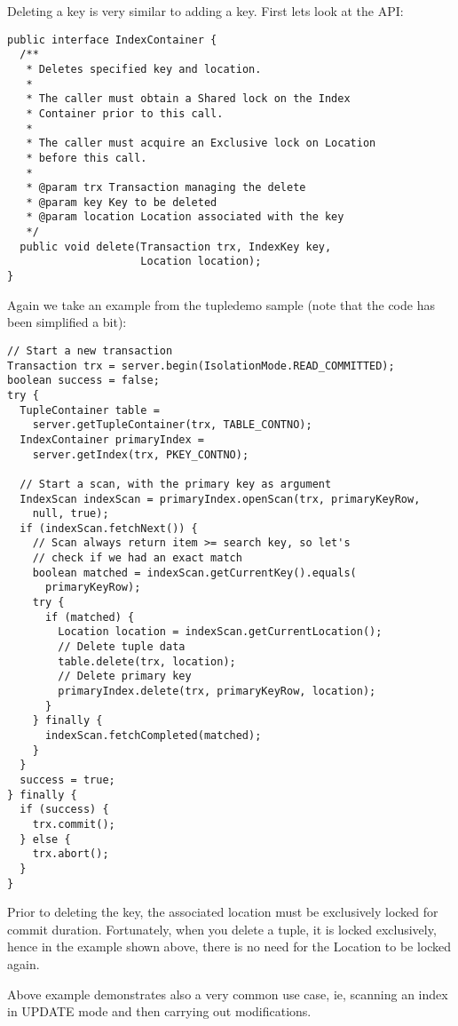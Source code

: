\documentclass[a4paper,draft,oneside]{book}
\begin{document}
Deleting a key is very similar to adding a key. First lets look
at the API:

\begin{verbatim}
public interface IndexContainer {
  /**
   * Deletes specified key and location. 
   * 
   * The caller must obtain a Shared lock on the Index 
   * Container prior to this call.
   *
   * The caller must acquire an Exclusive lock on Location 
   * before this call.
   * 
   * @param trx Transaction managing the delete
   * @param key Key to be deleted
   * @param location Location associated with the key
   */
  public void delete(Transaction trx, IndexKey key, 
                     Location location);
}
\end{verbatim}

Again we take an example from the tupledemo sample (note that
the code has been simplified a bit):

\begin{verbatim}
// Start a new transaction
Transaction trx = server.begin(IsolationMode.READ_COMMITTED);
boolean success = false;
try {
  TupleContainer table = 
    server.getTupleContainer(trx, TABLE_CONTNO);
  IndexContainer primaryIndex = 
    server.getIndex(trx, PKEY_CONTNO);

  // Start a scan, with the primary key as argument
  IndexScan indexScan = primaryIndex.openScan(trx, primaryKeyRow,
    null, true);
  if (indexScan.fetchNext()) {
    // Scan always return item >= search key, so let's
    // check if we had an exact match
    boolean matched = indexScan.getCurrentKey().equals(
      primaryKeyRow);
    try {
      if (matched) {
        Location location = indexScan.getCurrentLocation();
        // Delete tuple data
        table.delete(trx, location);
        // Delete primary key
        primaryIndex.delete(trx, primaryKeyRow, location);
      }
    } finally {
      indexScan.fetchCompleted(matched);
    }
  }
  success = true;
} finally {
  if (success) {
    trx.commit();
  } else {
    trx.abort();
  }
}
\end{verbatim}

Prior to deleting the key, the associated location must be
exclusively locked for commit duration. Fortunately, when you delete
a tuple, it is locked exclusively, hence in the example shown above,
there is no need for the Location to be locked again.

Above example demonstrates also a very common use case, ie, scanning
an index in UPDATE mode and then carrying out modifications. 
\end{document}
